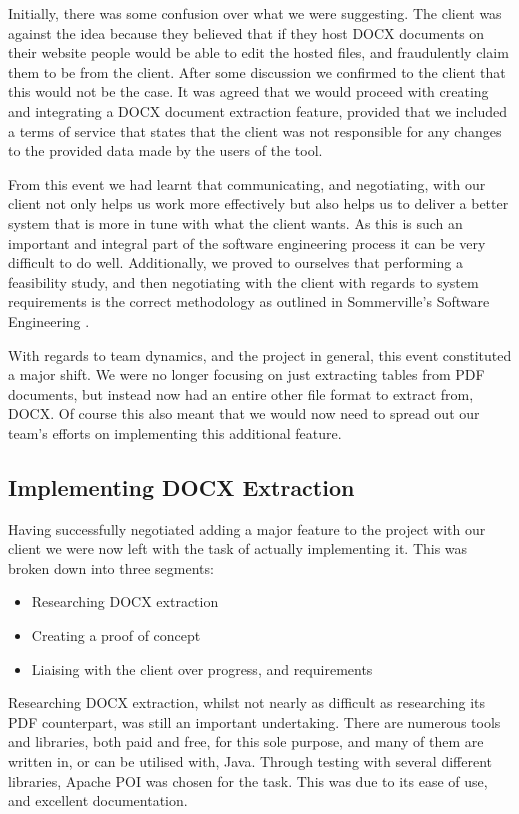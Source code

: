 \documentclass{l3proj}
\begin{document}
Initially, there was some confusion over what we were suggesting. The client was against the idea because they believed that if they host DOCX documents on their website people would be able to edit the hosted files, and fraudulently claim them to be from the client. After some discussion we confirmed to the client that this would not be the case. It was agreed that we would proceed with creating and integrating a DOCX document extraction feature, provided that we included a terms of service that states that the client was not responsible for any changes to the provided data made by the users of the tool.

From this event we had learnt that communicating, and negotiating, with our client not only helps us work more effectively but also helps us to deliver a better system that is more in tune with what the client wants. As this is such an important and integral part of the software engineering process it can be very difficult to do well. Additionally, we proved to ourselves that performing a feasibility study, and then negotiating with the client with regards to system requirements is the correct methodology as outlined in Sommerville's Software Engineering \cite{Requirements}.

With regards to team dynamics, and the project in general, this event constituted a major shift. We were no longer focusing on just extracting tables from PDF documents, but instead now had an entire other file format to extract from, DOCX. Of course this also meant that we would now need to spread out our team's efforts on implementing this additional feature.

\subsection{Implementing DOCX Extraction}
\label{sec:impl_docx}
Having successfully negotiated adding a major feature to the project with our client we were now left with the task of actually implementing it. This was broken down into three segments:
\begin{itemize}
    \item Researching DOCX extraction
    \item Creating a proof of concept
    \item Liaising with the client over progress, and requirements
\end{itemize}

Researching DOCX extraction, whilst not nearly as difficult as researching its PDF counterpart, was still an important undertaking. There are numerous tools and libraries, both paid and free, for this sole purpose, and many of them are written in, or can be utilised with, Java. Through testing with several different libraries, Apache POI was chosen for the task. This was due to its ease of use, and excellent documentation.
\end{document}
